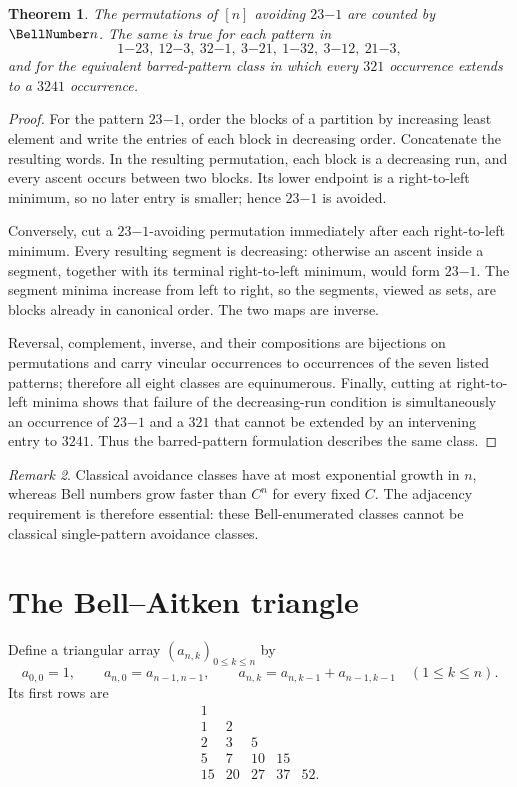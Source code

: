 \documentclass[11pt,a4paper,oneside,openany]{book}
\newtheorem{theorem}{Theorem}[chapter]
\theoremstyle{definition}
\theoremstyle{remark}
\newtheorem{remark}[theorem]{Remark}
\begin{document}
\begin{theorem}
The permutations of $[n]$ avoiding $23\!\mathord{-}\!1$ are counted by $\BellNumber n$.
The same is true for each pattern in
\[
 1\!\mathord{-}\!23,\ 12\!\mathord{-}\!3,\ 32\!\mathord{-}\!1,
 \ 3\!\mathord{-}\!21,\ 1\!\mathord{-}\!32,\ 3\!\mathord{-}\!12,
 \ 21\!\mathord{-}\!3,
\]
and for the equivalent barred-pattern class in which every $321$ occurrence
extends to a $3241$ occurrence.
\end{theorem}
\begin{proof}
For the pattern $23\!\mathord{-}\!1$, order the blocks of a partition by increasing
least element and write the entries of each block in decreasing order.  Concatenate
the resulting words.  In the resulting permutation, each block is a decreasing
run, and every ascent occurs between two blocks.  Its lower endpoint is a
right-to-left minimum, so no later entry is smaller; hence $23\!\mathord{-}\!1$ is
avoided.

Conversely, cut a $23\!\mathord{-}\!1$-avoiding permutation immediately after
each right-to-left minimum.  Every resulting segment is decreasing: otherwise an
ascent inside a segment, together with its terminal right-to-left minimum, would
form $23\!\mathord{-}\!1$.  The segment minima increase from left to right, so the
segments, viewed as sets, are blocks already in canonical order.  The two maps are
inverse.

Reversal, complement, inverse, and their compositions are bijections on
permutations and carry vincular occurrences to occurrences of the seven listed
patterns; therefore all eight classes are equinumerous.  Finally, cutting at
right-to-left minima shows that failure of the decreasing-run condition is
simultaneously an occurrence of $23\!\mathord{-}\!1$ and a $321$ that cannot be
extended by an intervening entry to $3241$.  Thus the barred-pattern formulation
describes the same class.
\end{proof}

\begin{remark}
Classical avoidance classes have at most exponential growth in $n$, whereas Bell
numbers grow faster than $C^n$ for every fixed $C$.  The adjacency requirement is
therefore essential: these Bell-enumerated classes cannot be classical
single-pattern avoidance classes.
\end{remark}

\section{The Bell--Aitken triangle}
Define a triangular array $(a_{n,k})_{0\le k\le n}$ by
\[
 a_{0,0}=1,\qquad a_{n,0}=a_{n-1,n-1},\qquad
 a_{n,k}=a_{n,k-1}+a_{n-1,k-1}\quad(1\le k\le n).
\]
Its first rows are
\[
\begin{array}{rrrrr}
1\\
1&2\\
2&3&5\\
5&7&10&15\\
15&20&27&37&52.
\end{array}
\]
\end{document}
